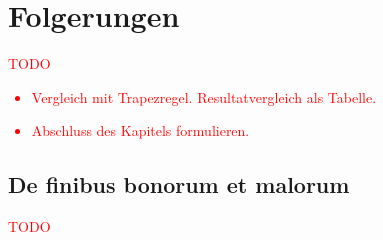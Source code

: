 %
%
%
\section{Folgerungen
\label{quadratur:section:folgerungen}}

\textcolor{red}{
    TODO
    \begin{itemize}
        \item Vergleich mit Trapezregel. Resultatvergleich als Tabelle.
        \item Abschluss des Kapitels formulieren.
    \end{itemize}
}

\subsection{De finibus bonorum et malorum
\label{quadratur:subsection:malorum}}
\textcolor{red}{TODO}


